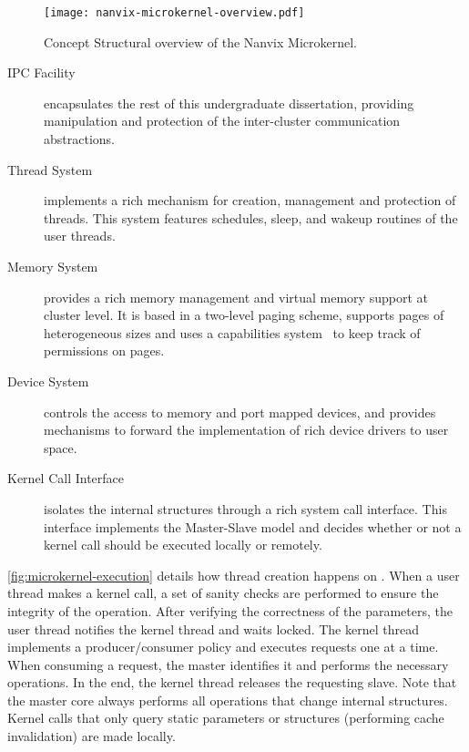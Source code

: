 		\begin{figure}[!tb]
			\centering%
			\caption{Concept Structural overview of the Nanvix Microkernel.}%
			\label{fig:microkernel-overview}%
			\texttt{[image: nanvix-microkernel-overview.pdf]}%
		\end{figure}

		\begin{description}

			\item[IPC Facility]
				encapsulates the rest of this undergraduate dissertation, providing
				manipulation and protection of the inter-cluster communication abstractions.
				
			\item[Thread System]
				implements a rich mechanism for creation, management and protection of threads.
				This system features schedules, sleep, and wakeup routines of the user threads.
				
			\item[Memory System]
				provides a rich memory management and virtual memory support at cluster level.
				It is based in a two-level paging scheme, supports pages of heterogeneous sizes
				and uses a capabilities system~\cite{Baumann2009} to keep track of permissions on pages.

			\item[Device System]
				controls the access to memory and port mapped devices, and provides
				mechanisms to forward the implementation of rich device drivers to user space.

			\item[Kernel Call Interface]
				isolates the \microkernel internal structures through a rich system call interface.
				This interface implements the Master-Slave \os model
				and decides whether or not a kernel call should be executed locally or remotely.

		\end{description}

		\autoref{fig:microkernel-execution} details how thread creation
		happens on \nanvix \microkernel.
		When a user thread makes a kernel call, a set of sanity checks are performed
		to ensure the integrity of the operation.
		After verifying the correctness of the parameters, the user thread notifies
		the kernel thread and waits locked.
		The kernel thread implements a producer/consumer policy and executes requests
		one at a time.
		When consuming a request, the master identifies it and performs the necessary operations.
		In the end, the kernel thread releases the requesting slave.
		Note that the master core always performs all operations that change internal
		\os structures.
		Kernel calls that only query static parameters or structures (performing cache invalidation) are made locally.


